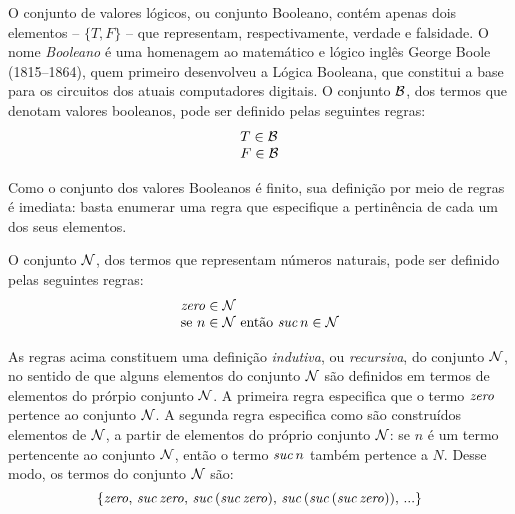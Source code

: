 
\begin{Definition}
  O conjunto de valores lógicos, ou conjunto Booleano, contém apenas dois elementos -- $\{T,F\}$ -- que representam, respectivamente, verdade e falsidade. O nome \emph{Booleano} é uma homenagem ao matemático e lógico inglês George Boole  (1815--1864), quem primeiro desenvolveu a Lógica Booleana, que constitui a base para os circuitos dos atuais computadores digitais. O conjunto $\mathcal{B}$, dos termos que denotam valores booleanos, pode ser definido pelas seguintes regras:
  \[
      \begin{array}{l}
        T \in\mathcal{B}\\
        F \in\mathcal{B}
      \end{array}
  \]
\end{Definition}

Como o conjunto dos valores Booleanos \'e finito, sua defini\c{c}\~ao por meio de regras \'e imediata: basta enumerar uma regra que especifique a pertinência de cada um dos seus elementos. 

\begin{Definition}
O conjunto $\mathcal{N}$, dos termos que representam n\'umeros naturais, pode ser definido pelas seguintes regras:
\[
   \begin{array}{l}
     \textit{zero\/} \in \mathcal{N}\\
     \text{se $n \in \mathcal{N}$ ent\~ao $\textit{suc\/}\, n\in\mathcal{N}$}
   \end{array}
\]
\end{Definition}
As regras acima constituem uma definição \emph{indutiva}, ou \emph{recursiva\/}, do conjunto $\mathcal{N}$, no sentido de que alguns elementos do conjunto $\mathcal{N}$ são definidos em termos de elementos do prórpio conjunto $\mathcal{N}$. A primeira regra especifica que o termo $\textit{zero\/}$ pertence ao conjunto $\mathcal{N}$. A segunda regra especifica como são construídos elementos de $\mathcal{N}$, a partir de elementos do próprio conjunto $\mathcal{N}$:  se $n$ \'e um termo pertencente ao conjunto $\mathcal{N}$, ent\~ao o termo $\textit{suc\/}\,n$ tamb\'em pertence a $N$. Desse modo, os termos do conjunto $\mathcal{N}$ são:
\[ \{\textit{zero\/},\,\textit{suc\/}\,\textit{zero\/},\,\textit{suc\/}\,(\textit{suc\/}\,\textit{zero\/}),\, \textit{suc\/}\,(\textit{suc\/}\,(\textit{suc\/}\,\textit{zero\/})),\,...\} \] 


